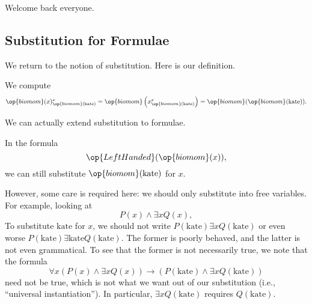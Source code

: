 \documentclass[../notes.tex]{subfiles}
\begin{document}

Welcome back everyone.

\subsection{Substitution for Formulae}
We return to the notion of substitution. Here is our definition.
\subdef*
\begin{example}
	We compute
	\[\op{biomom}(x)^x_{\op{biomom}(\mathrm{kate})}=\op{biomom}\left(x^x_{\op{biomom}(\mathrm{kate})}\right)=\op{biomom}(\op{biomom}(\mathrm{kate})).\]
\end{example}
We can actually extend substitution to formulae.
\begin{example}
	In the formula
	\[\op{LeftHanded}(\op{biomom}(x)),\]
	we can still substitute $\op{biomom}(\mathrm{kate})$ for $x$.
\end{example}
However, some care is required here: we should only substitute into free variables. For example, looking at
\[P(x)\land\exists xQ(x),\]
To substitute $\mathrm{kate}$ for $x$, we should not write $P(\mathrm{kate})\exists xQ(\mathrm{kate})$ or even worse $P(\mathrm{kate})\exists\mathrm{kate}Q(\mathrm{kate})$. The former is poorly behaved, and the latter is not even grammatical. To see that the former is not necessarily true, we note that the formula
\[\forall x(P(x)\land\exists xQ(x))\to(P(\mathrm{kate})\land\exists xQ(\mathrm{kate}))\]
need not be true, which is not what we want out of our substitution (i.e., ``universal instantiation''). In particular, $\exists xQ(\mathrm{kate})$ requires $Q(\mathrm{kate})$.
\end{document}
